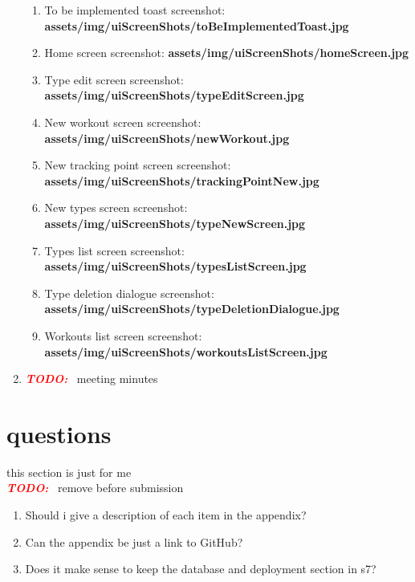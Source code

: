 \documentclass{article}
\newcommand{\TODO}{\textbf{\textit{\textcolor{red}{TODO:}}} }
\begin{document}
\begin{multicols}{2}
\begin{enumerate}
\begin{enumerate}
      \item To be implemented toast screenshot: \textbf{assets/img/uiScreenShots/toBeImplementedToast.jpg}\\
      \item Home screen screenshot: \textbf{assets/img/uiScreenShots/homeScreen.jpg}\\ 
      \item Type edit screen screenshot: \textbf{assets/img/uiScreenShots/typeEditScreen.jpg}\\
      \item New workout screen screenshot: \textbf{assets/img/uiScreenShots/newWorkout.jpg}\\
      \item New tracking point screen screenshot: \textbf{assets/img/uiScreenShots/trackingPointNew.jpg}\\
      \item New types screen screenshot: \textbf{assets/img/uiScreenShots/typeNewScreen.jpg}\\
      \item Types list screen screenshot: \textbf{assets/img/uiScreenShots/typesListScreen.jpg}\\
      \item Type deletion dialogue screenshot: \textbf{assets/img/uiScreenShots/typeDeletionDialogue.jpg}\\
      \item Workouts list screen screenshot: \textbf{assets/img/uiScreenShots/workoutsListScreen.jpg}\\
    \end{enumerate}
  \item \TODO~meeting minutes
\end{enumerate}

\section{questions} 
this section is just for me\\
\TODO~remove before submission\\
\begin{enumerate}
  \item Should i give a description of each item in the appendix?
  \item Can the appendix be just a link to GitHub?
  \item Does it make sense to keep the database and deployment section in s7?
\end{enumerate}


\end{multicols}
\end{document}
